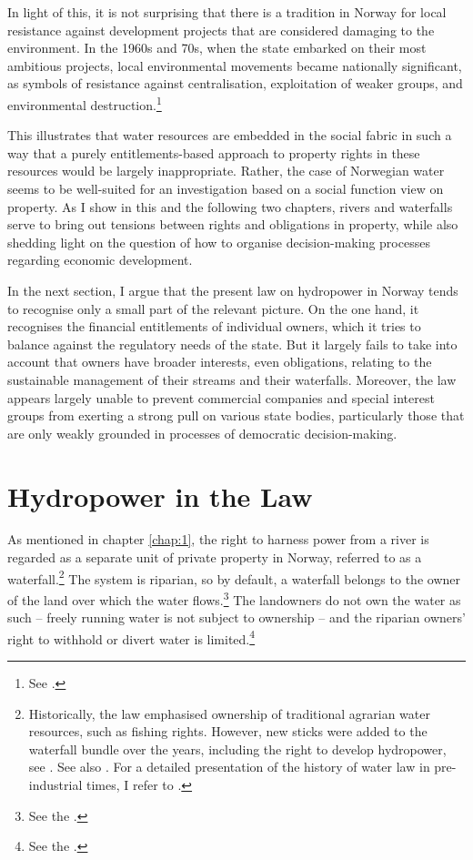 In light of this, it is not surprising that there is a tradition in Norway for local resistance against development projects that are considered damaging to the environment. In the 1960s and 70s, when the state embarked on their most ambitious projects, local environmental movements became nationally significant, as symbols of resistance against centralisation, exploitation of weaker groups, and environmental destruction.\footnote{See \cite{nilsen08}.}

This illustrates that water resources are embedded in the social fabric in such a way that a purely entitlements-based approach to property rights in these resources would be largely inappropriate. Rather, the case of Norwegian water seems to be well-suited for an investigation based on a social function view on property. As I show in this and the following two chapters, rivers and waterfalls serve to bring out tensions between rights and obligations in property, while also shedding light on the question of how to organise decision-making processes regarding economic development.

In the next section, I argue that the present law on hydropower in Norway tends to recognise only a small part of the relevant picture. On the one hand, it recognises the financial entitlements of individual owners, which it tries to balance against the regulatory needs of the state. But it largely fails to take into account that owners have broader interests, even obligations, relating to the sustainable management of their streams and their waterfalls. Moreover, the law appears largely unable to prevent commercial companies and special interest groups from exerting a strong pull on various state bodies, particularly those that are only weakly grounded in processes of democratic decision-making.

\section{Hydropower in the Law}\label{sec:4:3}

As mentioned in chapter \ref{chap:1}, the right to harness power from a river is regarded as a separate unit of private property in Norway, referred to as a waterfall.\footnote{Historically, the law emphasised ownership of traditional agrarian water resources, such as fishing rights. However, new sticks were added to the waterfall bundle over the years, including the right to develop hydropower, see \cite[14-32]{vislie44}. See also \cite[108]{nordtveit15}. For a detailed presentation of the history of water law in pre-industrial times, I refer to \cite{motzfeld08}.} The system is riparian, so by default, a waterfall belongs to the owner of the land over which the water flows.\footnote{See the \dni\cite[13]{wra00}.} The landowners do not own the water as such -- freely running water is not subject to ownership -- and the riparian owners' right to withhold or divert water is limited.\footnote{See the \dni\cite[8|15]{wra00}.} 

